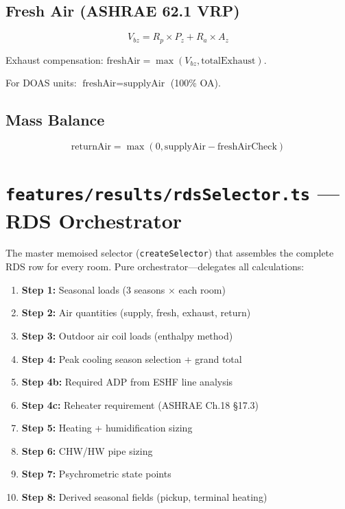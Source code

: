 \documentclass[12pt, a4paper, oneside]{report}
\newcommand{\file}[1]{\texttt{\textcolor{codeblue}{#1}}}
\newcommand{\code}[1]{\texttt{\textcolor{codered}{#1}}}
\begin{document}
\subsection{Fresh Air (ASHRAE 62.1 VRP)}

\begin{equation}
  V_{bz} = R_p \times P_z + R_a \times A_z
\end{equation}

Exhaust compensation: $\text{freshAir} = \max(V_{bz}, \text{totalExhaust})$.

For DOAS units: $\text{freshAir} = \text{supplyAir}$ (100\% OA).

\subsection{Mass Balance}

\begin{equation}
  \text{returnAir} = \max(0, \text{supplyAir} - \text{freshAirCheck})
\end{equation}

\section{\file{features/results/rdsSelector.ts} --- RDS Orchestrator}

The master memoised selector (\code{createSelector}) that assembles the complete RDS row for every room. Pure orchestrator---delegates all calculations:

\begin{enumerate}
  \item \textbf{Step 1:} Seasonal loads (3 seasons $\times$ each room)
  \item \textbf{Step 2:} Air quantities (supply, fresh, exhaust, return)
  \item \textbf{Step 3:} Outdoor air coil loads (enthalpy method)
  \item \textbf{Step 4:} Peak cooling season selection + grand total
  \item \textbf{Step 4b:} Required ADP from ESHF line analysis
  \item \textbf{Step 4c:} Reheater requirement (ASHRAE Ch.18 \S17.3)
  \item \textbf{Step 5:} Heating + humidification sizing
  \item \textbf{Step 6:} CHW/HW pipe sizing
  \item \textbf{Step 7:} Psychrometric state points
  \item \textbf{Step 8:} Derived seasonal fields (pickup, terminal heating)
\end{enumerate}
\end{document}
